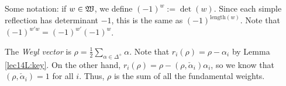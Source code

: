 
 Some notation: if $w\in \mathfrak{W}$, we define $(-1)^w := \det(w)$. Since each simple
 reflection has determinant $-1$, this is the same as $(-1)^{\text{length}(w)}$. Note
 that $(-1)^{w'w}=(-1)^{w'}(-1)^w$.

 The \emph{Weyl vector} is $\rho = \frac{1}{2} \sum_{\alpha
 \in \Delta^+}\alpha$. Note that $r_i(\rho) = \rho-\alpha_i$ by Lemma
 \ref{lec14L:key}. On  the other hand, $r_i(\rho)= \rho - (\rho,\check
 \alpha_i)\alpha_i$, so we know that $(\rho,\check \alpha_i)=1$ for all $i$. Thus,
 $\rho$ is the sum of all the fundamental weights.

